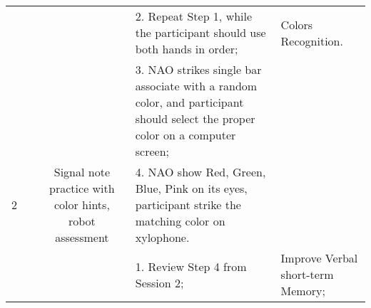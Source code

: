 \begin{sidewaystable}[tbp]
\begin{center}
{\begin{tabular}{cccll}
	{\color[HTML]{666666} }                    & {\color[HTML]{666666} }                                          & {\color[HTML]{666666} }                                                                                                                               & {\color[HTML]{666666} 2. Repeat Step 1, while the   participant should use both hands in order;}                                                                                     & {\color[HTML]{666666} Colors Recognition.}                                                                                                                             \\
	{\color[HTML]{666666} }                    & {\color[HTML]{666666} }                                          & {\color[HTML]{666666} }                                                                                                                               & {\color[HTML]{666666} 3. NAO strikes single bar   associate with a random color, and participant should select the proper color   on a computer screen;}                             &                                                                                                                                                                        \\
	\multirow{-4}{*}{{\color[HTML]{666666} 2}} & {\color[HTML]{666666} }                                          & \multirow{-4}{*}{{\color[HTML]{666666} Signal note practice with color hints, robot assessment}}                                                      & {\color[HTML]{666666} 4. NAO show Red, Green, Blue,   Pink on its eyes, participant strike the matching color on xylophone.}                                                         &                                                                                                                                                                        \\
	{\color[HTML]{666666} }                    & {\color[HTML]{666666} }                                          & \multicolumn{1}{l}{{\color[HTML]{666666} }}                                                                                                           & {\color[HTML]{666666} 1. Review Step 4 from Session 2;}                                                                                                                              & {\color[HTML]{666666} Improve Verbal short-term Memory;}                                                                                                               \\

\end{tabular}}
\end{center}
\end{sidewaystable}
